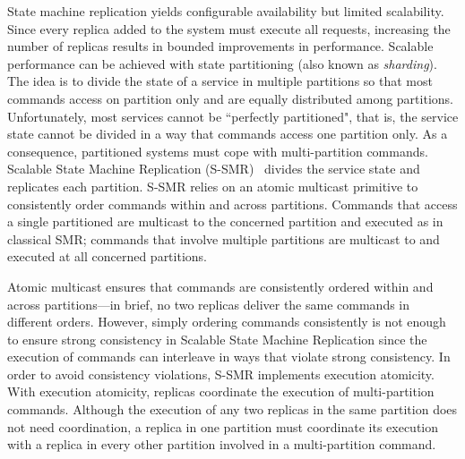 \documentclass[11pt]{article}
\begin{document}
State machine replication yields configurable availability but limited scalability.
Since every replica added to the system must execute all requests, 
increasing the number of replicas results in bounded improvements in performance.
Scalable performance can be achieved with state partitioning (also known as \emph{sharding}).
The idea is to divide the state of a service in multiple partitions so that most commands access on partition only and are equally distributed among partitions. 
Unfortunately, most services cannot be ``perfectly partitioned", that is, the service state cannot be divided in a way that commands access one partition only.
As a consequence, partitioned systems must cope with multi-partition commands.
Scalable State Machine Replication (S-SMR)~\cite{bezerra2014ssmr} divides the service state and replicates each partition. 
S-SMR relies on an atomic multicast primitive to consistently order commands within and across partitions. 
Commands that access a single partitioned are multicast to the concerned partition and executed as in classical SMR;
commands that involve multiple partitions are multicast to and executed at all concerned partitions.

Atomic multicast ensures that commands are consistently ordered within and across partitions---in brief, no two replicas deliver the same commands in different orders.
However, simply ordering commands consistently is not enough to ensure strong consistency in Scalable State Machine Replication since the execution of commands can interleave in ways that violate strong consistency.
In order to avoid consistency violations, S-SMR implements execution atomicity. 
With execution atomicity, replicas coordinate the execution of multi-partition commands.
Although the execution of any two replicas in the same partition does not need coordination, a replica in one partition must coordinate its execution with a replica in every other partition involved in a multi-partition command.
\end{document}
